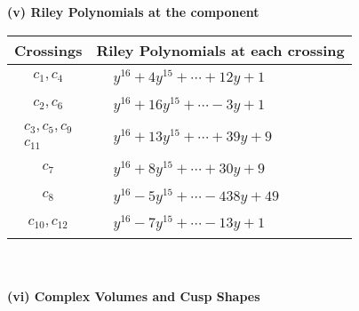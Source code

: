 \documentclass[1p]{elsarticle_modified}
\theoremstyle{definition}
\begin{document}
\newpage\renewcommand{\arraystretch}{1}
\flushleft \textbf{(v) Riley Polynomials at the component}\newline \\
\begin{tabular}{m{50pt}|m{274pt}}
Crossings & \hspace{64pt}Riley Polynomials at each crossing \\
\hline $$\begin{aligned}c_{1},c_{4}\end{aligned}$$&$\begin{aligned}
&y^{16}+4 y^{15}+\cdots+12 y+1
\end{aligned}$\\
\hline $$\begin{aligned}c_{2},c_{6}\end{aligned}$$&$\begin{aligned}
&y^{16}+16 y^{15}+\cdots-3 y+1
\end{aligned}$\\
\hline $$\begin{aligned}c_{3},c_{5},c_{9}\\c_{11}\end{aligned}$$&$\begin{aligned}
&y^{16}+13 y^{15}+\cdots+39 y+9
\end{aligned}$\\
\hline $$\begin{aligned}c_{7}\end{aligned}$$&$\begin{aligned}
&y^{16}+8 y^{15}+\cdots+30 y+9
\end{aligned}$\\
\hline $$\begin{aligned}c_{8}\end{aligned}$$&$\begin{aligned}
&y^{16}-5 y^{15}+\cdots-438 y+49
\end{aligned}$\\
\hline $$\begin{aligned}c_{10},c_{12}\end{aligned}$$&$\begin{aligned}
&y^{16}-7 y^{15}+\cdots-13 y+1
\end{aligned}$\\
\hline
\end{tabular}\\~\\
\newpage\flushleft \textbf{(vi) Complex Volumes and Cusp Shapes}
\end{document}
